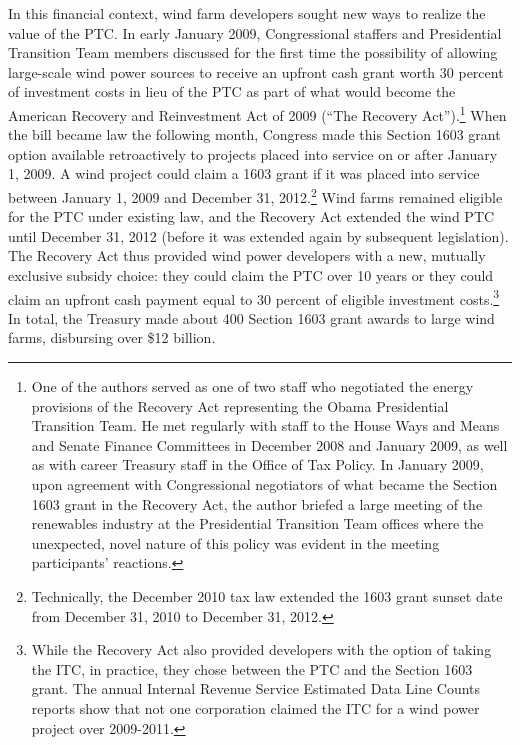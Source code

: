 \documentclass[12pt]{article}
\begin{document}
In this financial context, wind farm developers sought new ways to realize the value of the PTC. In early January 2009, Congressional staffers and Presidential Transition Team members discussed for the first time the possibility of allowing large-scale wind power sources to receive an upfront cash grant worth 30 percent of investment costs in lieu of the PTC as part of what would become the American Recovery and Reinvestment Act of 2009 (``The Recovery Act'').\footnote{One of the authors served as one of two staff who negotiated the energy provisions of the Recovery Act representing the Obama Presidential Transition Team. He met regularly with staff to the House Ways and Means and Senate Finance Committees in December 2008 and January 2009, as well as with career Treasury staff in the Office of Tax Policy. In January 2009, upon agreement with Congressional negotiators of what became the Section 1603 grant in the Recovery Act, the author briefed a large meeting of the renewables industry at the Presidential Transition Team offices where the unexpected, novel nature of this policy was evident in the meeting participants' reactions.} When the bill became law the following month, Congress made this Section 1603 grant option available retroactively to projects placed into service on or after January 1, 2009. A wind project could claim a 1603 grant if it was placed into service between January 1, 2009 and December 31, 2012.\footnote{Technically, the December 2010 tax law extended the 1603 grant sunset date from December 31, 2010 to December 31, 2012.} Wind farms remained eligible for the PTC under existing law, and the Recovery Act extended the wind PTC until December 31, 2012 (before it was extended again by subsequent legislation). The Recovery Act thus provided wind power developers with a new, mutually exclusive subsidy choice: they could claim the PTC over 10 years or they could claim an upfront cash payment equal to 30 percent of eligible investment costs.\footnote{While the Recovery Act also provided developers with the option of taking the ITC, in practice, they chose between the PTC and the Section 1603 grant. The annual Internal Revenue Service Estimated Data Line Counts reports show that not one corporation claimed the ITC for a wind power project over 2009-2011.} In total, the Treasury made about 400 Section 1603 grant awards to large wind farms, disbursing over \$12 billion.
\end{document}

